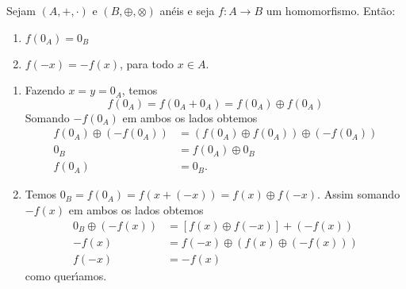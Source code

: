 \begin{proposicao}
    Sejam $(A, +, \cdot)$ e $(B, \oplus, \otimes)$ an\'eis e seja $f : A \to B$ um homomorfismo. Ent{\~a}o:
    \begin{enumerate}[label={\roman*})]
        \item $f(0_{A}) = 0_{B}$
        \item $f(-x) = -f(x)$, para todo $x \in A$.
    \end{enumerate}
\end{proposicao}
\begin{prova}
    \begin{enumerate}[label={\roman*})]
        \item Fazendo $x = y = 0_{A}$, temos
        \[
            f(0_A) = f(0_A + 0_A) = f(0_A) \oplus f(0_A)
        \]
        Somando $-f(0_A)$ em ambos os lados obtemos
        \begin{align*}
            f(0_A) \oplus (-f(0_A)) &= (f(0_A)\oplus f(0_A)) \oplus (-f(0_A))\\
            0_B &= f(0_A) \oplus 0_B\\
            f(0_A) &= 0_B.
        \end{align*}

        \item Temos $0_B = f(0_A) = f(x + (-x)) = f(x)\oplus f(-x)$. Assim somando $-f(x)$ em ambos os lados obtemos
        \begin{align*}
            0_B\oplus(-f(x)) &= [f(x)\oplus f(-x)] + (-f(x))\\
            -f(x) &= f(-x) \oplus (f(x) \oplus (-f(x)))\\
            f(-x) &= -f(x)
        \end{align*}
        como quer{\'\i}amos.
    \end{enumerate}
\end{prova}

